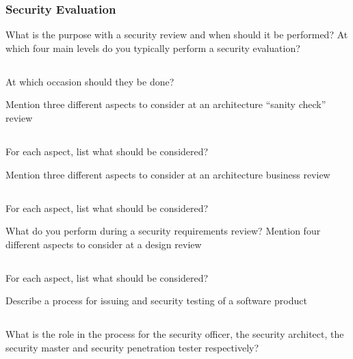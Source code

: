 \section{Security Evaluation}\label{sec:Security_Evaluation}
\begin{questions}
\question{} What is the purpose with a security review and when should it be performed?
\question{} At which four main levels do you typically perform a security evaluation?
  \begin{parts}
  \part{} At which occasion should they be done?
  \end{parts}

\question{} Mention three different aspects to consider at an architecture ``sanity check'' review
  \begin{parts}
  \part{} For each aspect, list what should be considered?
  \end{parts}

\question{} Mention three different aspects to consider at an architecture business review
  \begin{parts}
  \part{} For each aspect, list what should be considered?
  \end{parts}

\question{} What do you perform during a security requirements review?
\question{} Mention four different aspects to consider at a design review
  \begin{parts}
  \part{} For each aspect, list what should be considered?
  \end{parts}

\question{} Describe a process for issuing and security testing of a software product
  \begin{parts}
  \part{} What is the role in the process for the security officer, the security architect, the security master and security penetration tester respectively?
  \end{parts}


\end{questions}
